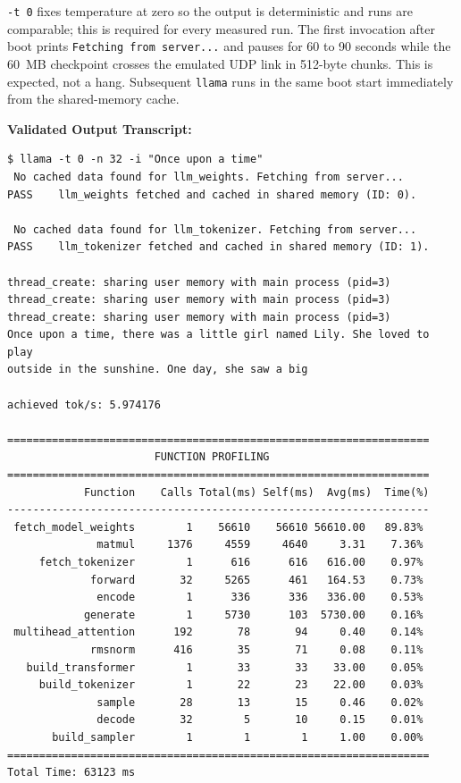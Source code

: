 \documentclass[11pt]{article}
\renewcommand{\_}{\origunderscore\allowbreak}
\begin{document}
\texttt{-t 0} fixes temperature at zero so the output is deterministic and runs are comparable; this is required for every measured run. The first invocation after boot prints \texttt{Fetching from server...} and pauses for 60 to 90 seconds while the 60~MB checkpoint crosses the emulated UDP link in 512-byte chunks. This is expected, not a hang. Subsequent \texttt{llama} runs in the same boot start immediately from the shared-memory cache.

\textbf{Validated Output Transcript:}
\begin{lstlisting}[basicstyle=\ttfamily\scriptsize]
$ llama -t 0 -n 32 -i "Once upon a time"
 No cached data found for llm_weights. Fetching from server...
PASS    llm_weights fetched and cached in shared memory (ID: 0).

 No cached data found for llm_tokenizer. Fetching from server...
PASS    llm_tokenizer fetched and cached in shared memory (ID: 1).

thread_create: sharing user memory with main process (pid=3)
thread_create: sharing user memory with main process (pid=3)
thread_create: sharing user memory with main process (pid=3)
Once upon a time, there was a little girl named Lily. She loved to play
outside in the sunshine. One day, she saw a big

achieved tok/s: 5.974176

==================================================================
                       FUNCTION PROFILING
==================================================================
            Function    Calls Total(ms) Self(ms)  Avg(ms)  Time(%)
------------------------------------------------------------------
 fetch_model_weights        1    56610    56610 56610.00   89.83%
              matmul     1376     4559     4640     3.31    7.36%
     fetch_tokenizer        1      616      616   616.00    0.97%
             forward       32     5265      461   164.53    0.73%
              encode        1      336      336   336.00    0.53%
            generate        1     5730      103  5730.00    0.16%
 multihead_attention      192       78       94     0.40    0.14%
             rmsnorm      416       35       71     0.08    0.11%
   build_transformer        1       33       33    33.00    0.05%
     build_tokenizer        1       22       23    22.00    0.03%
              sample       28       13       15     0.46    0.02%
              decode       32        5       10     0.15    0.01%
       build_sampler        1        1        1     1.00    0.00%
==================================================================
Total Time: 63123 ms


\end{lstlisting}
\end{document}
